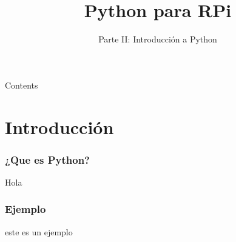 \documentclass[10pt,colorlinks]{beamer}
\title{ Python para RPi}
\subtitle
{Parte II: Introducción a Python} %
\begin{document}
\begin{frame}[plain]
   \maketitle
\end{frame}


\begin{frame}[allowframebreaks]{Contents}
  \tableofcontents
\end{frame}

\section{Introducción}

\begin{frame}[fragile]\frametitle{¿Que es Python?}
Hola
\end{frame}

\begin{frame}[fragile]\frametitle{Ejemplo}
este es un ejemplo
\end{frame}
\end{document}
